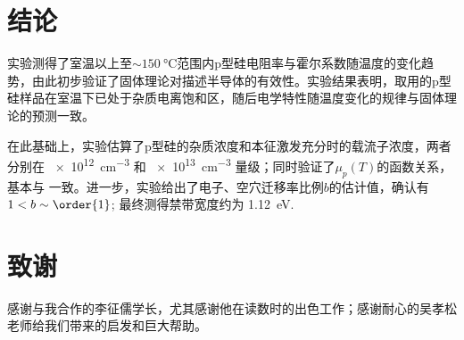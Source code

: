 \documentclass[aps,pre,12pt,preprint,%
	onecolumn,showpacs,showkeys,nofootinbib]{revtex4-1}
\begin{document}
\section{结论}
	实验测得了室温以上至$\sim\SI{150}{\celsius}$范围内p型硅电阻率与霍尔系数随温度的变化趋势，由此初步验证了固体理论对描述半导体的有效性。实验结果表明，取用的p型硅样品在室温下已处于杂质电离饱和区，随后电学特性随温度变化的规律与固体理论的预测一致。
	
	在此基础上，实验估算了p型硅的杂质浓度和本征激发充分时的载流子浓度，两者分别在 \SI{e12}{\cm^{-3}} 和 \SI{e13}{\cm^{-3}} 量级；同时验证了$\mu_p(T)$的函数关系，基本与 \cite{morin1954electrical} 一致。进一步，实验给出了电子、空穴迁移率比例$b$的估计值，确认有$1 < b \sim \order{1}$; 最终测得禁带宽度约为 \SI{1.12}{\eV}. 
\section{致谢}
	感谢与我合作的李征儒学长，尤其感谢他在读数时的出色工作；感谢耐心的吴孝松老师给我们带来的启发和巨大帮助。
\clearpage

\setlength{\bibsep}{2pt}
\linespread{1.2}\selectfont



\clearpage
\end{document}
